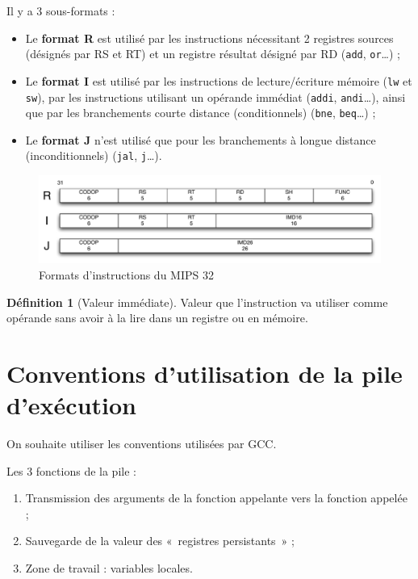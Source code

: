\documentclass[11pt,english,french]{scrreprt}
\theoremstyle{remark}
\theoremstyle{definition}
\newtheorem*{def*}{Définition}
\begin{document}
Il y a 3 sous-formats :\begin{itemize}
	\item Le \textbf{format R} est utilisé par les instructions nécessitant 2 registres sources (désignés par RS et RT) et un registre résultat désigné par RD (\lstinline!add!, \lstinline!or!\dots) ;
	\item Le \textbf{format I} est utilisé par les instructions de lecture/écriture mémoire (\lstinline!lw! et \lstinline!sw!), par les instructions utilisant un opérande immédiat (\lstinline!addi!, \lstinline!andi!\dots), ainsi que par les branchements courte distance (conditionnels) (\lstinline!bne!, \lstinline!beq!\dots) ;
	\item Le \textbf{format J} n’est utilisé que pour les branchements à longue distance (inconditionnels) (\lstinline!jal!, \lstinline!j!\dots).
\end{itemize}
\begin{figure}[!h]
	\center
	\includegraphics[scale=.5]{diagrammes/Format}
	\caption{Formats d'instructions du MIPS 32}
\end{figure}

\begin{def*}[Valeur immédiate]
	Valeur que l'instruction va utiliser comme opérande sans avoir à la lire dans un registre ou en mémoire.
\end{def*}


\section{Conventions d'utilisation de la pile d'exécution} %

On souhaite utiliser les conventions utilisées par GCC.

Les 3 fonctions de la pile :\begin{enumerate}
	\item Transmission des arguments de la fonction appelante vers la fonction appelée ;
	\item Sauvegarde de la valeur des « registres persistants » ;
	\item Zone de travail : variables locales.
\end{enumerate}
\end{document}
